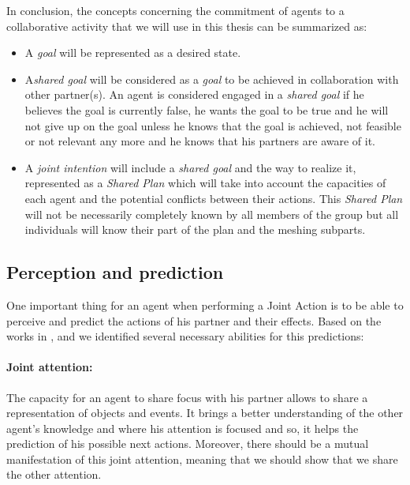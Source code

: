 \documentclass[english,a4paper,11pt,twoside]{StyleThese}
\begin{document}
In conclusion, the concepts concerning the commitment of agents to a collaborative activity that we will use in this thesis can be summarized as:
\begin{itemize}
\item A \textit{goal} will be represented as a desired state.
\item A\textit{shared goal} will be considered as a \textit{goal} to be achieved in collaboration with other partner(s). An agent is considered engaged in a \textit{shared goal} if he believes the goal is currently false, he wants the goal to be true and he will not give up on the goal unless he knows that the goal is achieved, not feasible or not relevant any more and he knows that his partners are aware of it.
\item A \textit{joint intention} will include a \textit{shared goal} and the way to realize it, represented as a \textit{Shared Plan} which will take into account the capacities of each agent and the potential conflicts between their actions. This \textit{Shared Plan} will not be necessarily completely known by all members of the group but all individuals will know their part of the plan and the meshing subparts.
\end{itemize}


\subsection{Perception and prediction}

\label{subsec:prediction}

One important thing for an agent when performing a Joint Action is to be able to perceive and predict the actions of his partner and their effects. Based on the works in \cite{sebanz2006joint}, \cite{pacherie2011phenomenology} and \cite{obhi2011moving} we identified several necessary abilities for this predictions:

\paragraph{Joint attention:} The capacity for an agent to share focus with his partner allows to share a representation of objects and events. It brings a better understanding of the other agent's knowledge and where his attention is focused and so, it helps the prediction of his possible next actions. Moreover, there should be a mutual manifestation of this joint attention, meaning that we should show that we share the other attention. 
\end{document}
